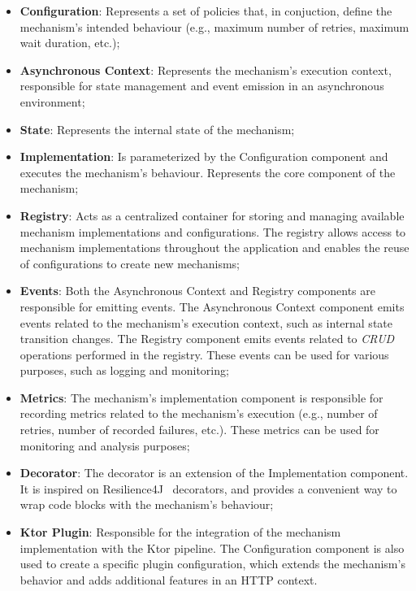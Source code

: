 \begin{itemize}
    \item \textbf{Configuration}: Represents a set of policies that, in conjuction, define the mechanism's intended behaviour (e.g., maximum number of retries, maximum wait duration, etc.);
    \item \textbf{Asynchronous Context}: Represents the mechanism's execution context, responsible for state management and event emission in an asynchronous environment;
    \item \textbf{State}: Represents the internal state of the mechanism;
    \item \textbf{Implementation}: Is parameterized by the Configuration component and executes the mechanism's behaviour.
    Represents the core component of the mechanism;
    \item \textbf{Registry}: Acts as a centralized container for storing and managing available mechanism implementations and configurations.
    The registry allows access to mechanism implementations throughout the application and enables the reuse of configurations to create new mechanisms;
    \item \textbf{Events}: Both the Asynchronous Context and Registry components are responsible for emitting events.
    The Asynchronous Context component emits events related to the mechanism's execution context, such as internal state transition changes.
    The Registry component emits events related to \textit{CRUD} operations performed in the registry.
    These events can be used for various purposes, such as logging and monitoring;
    \item \textbf{Metrics}: The mechanism's implementation component is responsible for recording metrics related to the mechanism's execution (e.g., number of retries, number of recorded failures, etc.).
    These metrics can be used for monitoring and analysis purposes;
    \item \textbf{Decorator}: The decorator is an extension of the Implementation component.
    It is inspired on Resilience4J~\cite{resilience4j} decorators, and provides a convenient way to wrap code blocks with the mechanism's behaviour;
    \item \textbf{Ktor Plugin}: Responsible for the integration of the mechanism implementation with the Ktor pipeline.
    The Configuration component is also used to create a specific plugin configuration, which extends the mechanism's behavior and adds additional features in an HTTP context.
\end{itemize}

